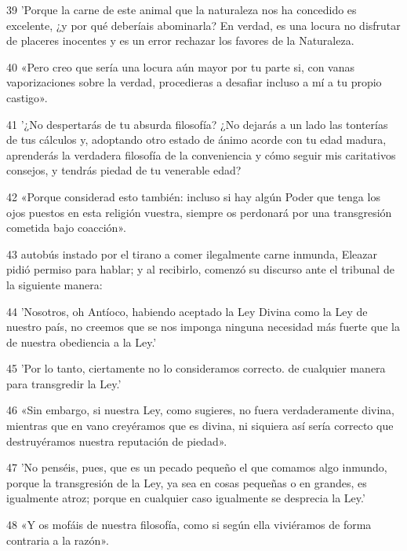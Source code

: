 \par 39 'Porque la carne de este animal que la naturaleza nos ha concedido es excelente, ¿y por qué deberíais abominarla? En verdad, es una locura no disfrutar de placeres inocentes y es un error rechazar los favores de la Naturaleza.

\par 40 «Pero creo que sería una locura aún mayor por tu parte si, con vanas vaporizaciones sobre la verdad, procedieras a desafiar incluso a mí a tu propio castigo».

\par 41 '¿No despertarás de tu absurda filosofía? ¿No dejarás a un lado las tonterías de tus cálculos y, adoptando otro estado de ánimo acorde con tu edad madura, aprenderás la verdadera filosofía de la conveniencia y cómo seguir mis caritativos consejos, y tendrás piedad de tu venerable edad?

\par 42 «Porque considerad esto también: incluso si hay algún Poder que tenga los ojos puestos en esta religión vuestra, siempre os perdonará por una transgresión cometida bajo coacción».

\par 43 autobús instado por el tirano a comer ilegalmente carne inmunda, Eleazar pidió permiso para hablar; y al recibirlo, comenzó su discurso ante el tribunal de la siguiente manera:

\par 44 'Nosotros, oh Antíoco, habiendo aceptado la Ley Divina como la Ley de nuestro país, no creemos que se nos imponga ninguna necesidad más fuerte que la de nuestra obediencia a la Ley.'

\par 45 'Por lo tanto, ciertamente no lo consideramos correcto. de cualquier manera para transgredir la Ley.'

\par 46 «Sin embargo, si nuestra Ley, como sugieres, no fuera verdaderamente divina, mientras que en vano creyéramos que es divina, ni siquiera así sería correcto que destruyéramos nuestra reputación de piedad».

\par 47 'No penséis, pues, que es un pecado pequeño el que comamos algo inmundo, porque la transgresión de la Ley, ya sea en cosas pequeñas o en grandes, es igualmente atroz; porque en cualquier caso igualmente se desprecia la Ley.'

\par 48 «Y os mofáis de nuestra filosofía, como si según ella viviéramos de forma contraria a la razón».

